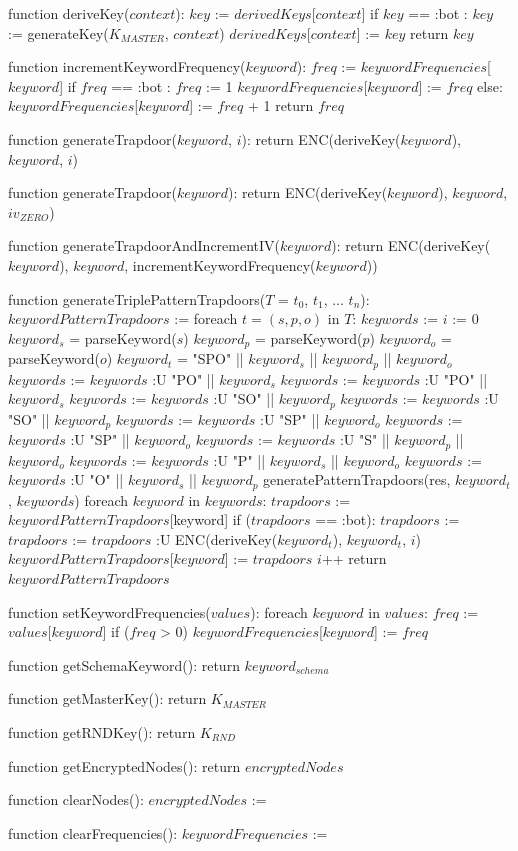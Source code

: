 function deriveKey($context$):
    $key$ := $derivedKeys$[$context$]
    if $key$ == :bot :
        $key$ := generateKey($K_{MASTER}$, $context$)
        $derivedKeys$[$context$] := $key$
    return $key$

function incrementKeywordFrequency($keyword$):
    $freq$ := $keywordFrequencies$[$keyword$]
    if $freq$ == :bot :
        $freq$ := 1
        $keywordFrequencies$[$keyword$] := $freq$
    else:
        $keywordFrequencies$[$keyword$] := $freq$ + 1
    return $freq$

function generateTrapdoor($keyword$, $i$):
    return ENC(deriveKey($keyword$), $keyword$, $i$)
    
function generateTrapdoor($keyword$):
    return ENC(deriveKey($keyword$), $keyword$, $iv_{ZERO}$)
	
function generateTrapdoorAndIncrementIV($keyword$):
    return ENC(deriveKey($keyword$), $keyword$, incrementKeywordFrequency($keyword$))

function generateTriplePatternTrapdoors($T$ = {$t_0$, $t_1$, ... $t_n$}):
    $keywordPatternTrapdoors$ := {}
    foreach $t = (s,p,o)$ in $T$:
        $keywords$ := {}
        $i$ := 0
        $keyword_s$ = parseKeyword($s$)
        $keyword_p$ = parseKeyword($p$)
        $keyword_o$ = parseKeyword($o$)
        $keyword_t$ = "SPO" || $keyword_s$ || $keyword_p$ || $keyword_o$
        $keywords$ := $keywords$ :U {"PO" || $keyword_s$}
        $keywords$ := $keywords$ :U {"PO" || $keyword_s$}
        $keywords$ := $keywords$ :U {"SO" || $keyword_p$}
        $keywords$ := $keywords$ :U {"SO" || $keyword_p$}
        $keywords$ := $keywords$ :U {"SP" || $keyword_o$}
        $keywords$ := $keywords$ :U {"SP" || $keyword_o$}
        $keywords$ := $keywords$ :U {"S" || $keyword_p$ || $keyword_o$}
        $keywords$ := $keywords$ :U {"P" || $keyword_s$ || $keyword_o$}
        $keywords$ := $keywords$ :U {"O" || $keyword_s$ || $keyword_p$}
        generatePatternTrapdoors(res, $keyword_t$, $keywords$)
        foreach $keyword$ in $keywords$:
            $trapdoors$ := $keywordPatternTrapdoors$[keyword]
            if ($trapdoors$ == :bot):
                $trapdoors$ := {}
            $trapdoors$ := $trapdoors$ :U {ENC(deriveKey($keyword_t$), $keyword_t$, $i$)}
            $keywordPatternTrapdoors$[$keyword$] := $trapdoors$
            $i$++
    return $keywordPatternTrapdoors$

function setKeywordFrequencies($values$):
    foreach $keyword$ in $values$:
        $freq$ := $values$[$keyword$]
        if ($freq$ > 0)
            $keywordFrequencies$[$keyword$] := $freq$
            
function getSchemaKeyword():
    return $keyword_{schema}$

function getMasterKey():
    return $K_{MASTER}$

function getRNDKey():
    return $K_{RND}$

function getEncryptedNodes():
    return $encryptedNodes$

function clearNodes():
    $encryptedNodes$ := {}

function clearFrequencies():
    $keywordFrequencies$ := {}